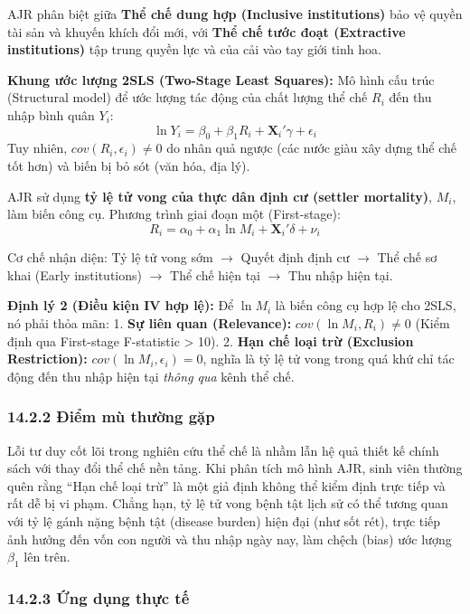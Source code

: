 \documentclass[
]{article}
\begin{document}
AJR phân biệt giữa \textbf{Thể chế dung hợp (Inclusive institutions)}
bảo vệ quyền tài sản và khuyến khích đổi mới, với \textbf{Thể chế tước
đoạt (Extractive institutions)} tập trung quyền lực và của cải vào tay
giới tinh hoa.

\textbf{Khung ước lượng 2SLS (Two-Stage Least Squares):} Mô hình cấu
trúc (Structural model) để ước lượng tác động của chất lượng thể chế
\(R_i\) đến thu nhập bình quân \(Y_i\):
\[ \ln Y_i = \beta_0 + \beta_1 R_i + \mathbf{X}_i'\gamma + \epsilon_i \]
Tuy nhiên, \(cov(R_i, \epsilon_i) \neq 0\) do nhân quả ngược (các nước
giàu xây dựng thể chế tốt hơn) và biến bị bỏ sót (văn hóa, địa lý).

AJR sử dụng \textbf{tỷ lệ tử vong của thực dân định cư (settler
mortality)}, \(M_i\), làm biến công cụ. Phương trình giai đoạn một
(First-stage):
\[ R_i = \alpha_0 + \alpha_1 \ln M_i + \mathbf{X}_i'\delta + \nu_i \]

Cơ chế nhận diện: Tỷ lệ tử vong sớm \(\rightarrow\) Quyết định định cư
\(\rightarrow\) Thể chế sơ khai (Early institutions) \(\rightarrow\) Thể
chế hiện tại \(\rightarrow\) Thu nhập hiện tại.

\textbf{Định lý 2 (Điều kiện IV hợp lệ):} Để \(\ln M_i\) là biến công cụ
hợp lệ cho 2SLS, nó phải thỏa mãn: 1. \textbf{Sự liên quan (Relevance):}
\(cov(\ln M_i, R_i) \neq 0\) (Kiểm định qua First-stage F-statistic
\textgreater{} 10). 2. \textbf{Hạn chế loại trừ (Exclusion
Restriction):} \(cov(\ln M_i, \epsilon_i) = 0\), nghĩa là tỷ lệ tử vong
trong quá khứ chỉ tác động đến thu nhập hiện tại \emph{thông qua} kênh
thể chế.

\subsubsection{14.2.2 Điểm mù thường
gặp}\label{ux111iux1ec3m-muxf9-thux1b0ux1eddng-gux1eb7p-7}

Lỗi tư duy cốt lõi trong nghiên cứu thể chế là nhầm lẫn hệ quả thiết kế
chính sách với thay đổi thể chế nền tảng. Khi phân tích mô hình AJR,
sinh viên thường quên rằng ``Hạn chế loại trừ'' là một giả định không
thể kiểm định trực tiếp và rất dễ bị vi phạm. Chẳng hạn, tỷ lệ tử vong
bệnh tật lịch sử có thể tương quan với tỷ lệ gánh nặng bệnh tật (disease
burden) hiện đại (như sốt rét), trực tiếp ảnh hưởng đến vốn con người và
thu nhập ngày nay, làm chệch (bias) ước lượng \(\beta_1\) lên trên.

\subsubsection{14.2.3 Ứng dụng thực
tế}\label{ux1ee9ng-dux1ee5ng-thux1ef1c-tux1ebf-1}
\end{document}
